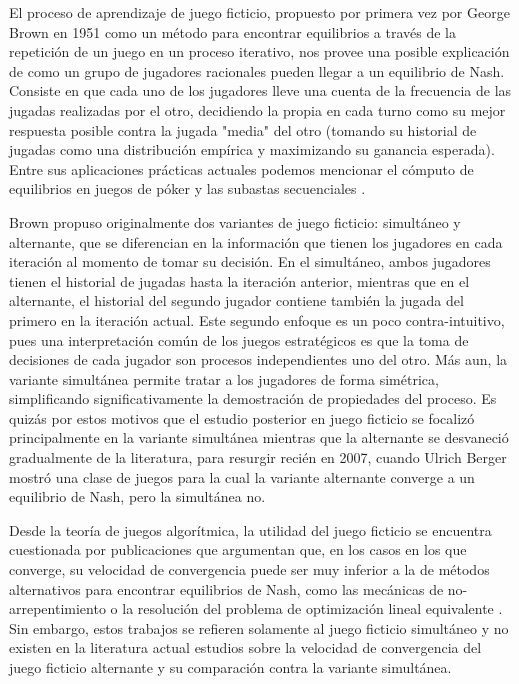El proceso de aprendizaje de juego ficticio, propuesto por primera vez por George Brown en 1951 \cite{brown:1951} como un método para encontrar equilibrios a través de la repetición de un juego en un proceso iterativo, nos provee una posible explicación de como un grupo de jugadores racionales pueden llegar a un equilibrio de Nash. Consiste en que cada uno de los jugadores lleve una cuenta de la frecuencia de las jugadas realizadas por el otro, decidiendo la propia en cada turno como su mejor respuesta posible contra la jugada "media" del otro (tomando su historial de jugadas como una distribución empírica y maximizando su ganancia esperada). Entre sus aplicaciones prácticas actuales podemos mencionar el cómputo de equilibrios en juegos de póker \cite{casos:uso:poker} y las subastas secuenciales \cite{casos:uso:subastas:secuenciales}.

Brown propuso originalmente dos variantes de juego ficticio: simultáneo y alternante, que se diferencian en la información que tienen los jugadores en cada iteración al momento de tomar su decisión. En el simultáneo, ambos jugadores tienen el historial de jugadas hasta la iteración anterior, mientras que en el alternante, el historial del segundo jugador contiene también la jugada del primero en la iteración actual. Este segundo enfoque es un poco contra-intuitivo, pues una interpretación común de los juegos estratégicos es que la toma de decisiones de cada jugador son procesos independientes uno del otro. Más aun, la variante simultánea permite tratar a los jugadores de forma simétrica, simplificando significativamente la demostración de propiedades del proceso. Es quizás por estos motivos que el estudio posterior en juego ficticio se focalizó principalmente en la variante simultánea mientras que la alternante se desvaneció gradualmente de la literatura, para resurgir recién en 2007, cuando Ulrich Berger \cite{browns:original} mostró una clase de juegos para la cual la variante alternante converge a un equilibrio de Nash, pero la simultánea no.

Desde la teoría de juegos algorítmica, la utilidad del juego ficticio se encuentra cuestionada por publicaciones que argumentan que, en los casos en los que converge, su velocidad de convergencia puede ser muy inferior a la de métodos alternativos para encontrar equilibrios de Nash, como las mecánicas de no-arrepentimiento o la resolución del problema de optimización lineal equivalente \cite{modified:fp:linear}. Sin embargo, estos trabajos se refieren solamente al juego ficticio simultáneo y no existen en la literatura actual estudios sobre la velocidad de convergencia del juego ficticio alternante y su comparación contra la variante simultánea.

